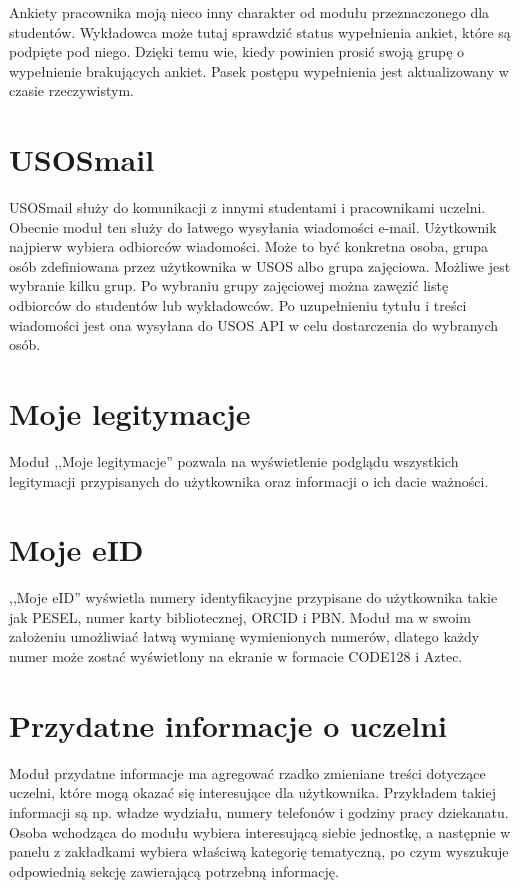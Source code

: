 \documentclass{pracamgr}
\begin{document}
Ankiety pracownika moją nieco inny charakter od modułu przeznaczonego dla studentów.
Wykładowca może tutaj sprawdzić status wypełnienia ankiet, które są podpięte pod
niego. Dzięki temu wie, kiedy powinien prosić swoją grupę o wypełnienie brakujących
ankiet. Pasek postępu wypełnienia jest aktualizowany w czasie rzeczywistym.

\section{USOSmail}

USOSmail służy do komunikacji z innymi studentami i pracownikami uczelni. Obecnie
moduł ten służy do łatwego wysyłania wiadomości e-mail. Użytkownik najpierw wybiera
odbiorców wiadomości. Może to być konkretna osoba, grupa osób zdefiniowana przez
użytkownika w USOS albo grupa zajęciowa. Możliwe jest wybranie kilku grup.
Po wybraniu grupy zajęciowej można zawęzić listę odbiorców do studentów lub
wykładowców. Po uzupełnieniu tytułu i treści wiadomości jest ona wysyłana do USOS
API w celu dostarczenia do wybranych osób.

\section{Moje legitymacje}

Moduł ,,Moje legitymacje'' pozwala na wyświetlenie podglądu wszystkich legitymacji
przypisanych do użytkownika oraz informacji o ich dacie ważności.

\section{Moje eID}

,,Moje eID'' wyświetla numery identyfikacyjne przypisane do użytkownika takie jak
PESEL, numer karty bibliotecznej, ORCID i PBN. Moduł ma w swoim założeniu umożliwiać
łatwą wymianę wymienionych numerów, dlatego każdy numer może zostać wyświetlony na
ekranie w formacie CODE128 i Aztec.

\section{Przydatne informacje o uczelni}

Moduł przydatne informacje ma agregować rzadko zmieniane treści dotyczące uczelni,
które mogą okazać się interesujące dla użytkownika. Przykładem takiej informacji
są np. władze wydziału, numery telefonów i godziny pracy dziekanatu. Osoba wchodząca
do modułu wybiera interesującą siebie jednostkę, a następnie w panelu z zakładkami
wybiera właściwą kategorię tematyczną, po czym wyszukuje odpowiednią sekcję
zawierającą potrzebną informację.
\end{document}
